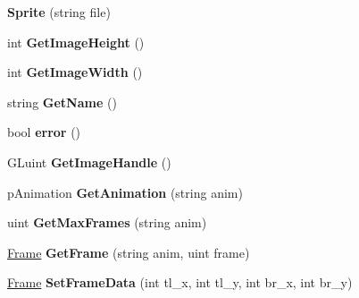 \begin{DoxyCompactItemize}
\item 
\hypertarget{classSprite_acde1b178d58809eccf9fd3791e9fcedf}{
{\bfseries Sprite} (string file)}
\label{classSprite_acde1b178d58809eccf9fd3791e9fcedf}

\item 
\hypertarget{classSprite_aeb66724513cb22636e1de4c3d409205a}{
int {\bfseries GetImageHeight} ()}
\label{classSprite_aeb66724513cb22636e1de4c3d409205a}

\item 
\hypertarget{classSprite_a1924333fc0272c4d565b75b665f2ba88}{
int {\bfseries GetImageWidth} ()}
\label{classSprite_a1924333fc0272c4d565b75b665f2ba88}

\item 
\hypertarget{classSprite_aa52fe643ed7c103b5c43295dcb24fe4e}{
string {\bfseries GetName} ()}
\label{classSprite_aa52fe643ed7c103b5c43295dcb24fe4e}

\item 
\hypertarget{classSprite_a9fca75610e94f0eedaeeea8c78379805}{
bool {\bfseries error} ()}
\label{classSprite_a9fca75610e94f0eedaeeea8c78379805}

\item 
\hypertarget{classSprite_a0f77680543c850cb6715238704fdd342}{
GLuint {\bfseries GetImageHandle} ()}
\label{classSprite_a0f77680543c850cb6715238704fdd342}

\item 
\hypertarget{classSprite_a053572baa76a5ba91ddd47787961786f}{
pAnimation {\bfseries GetAnimation} (string anim)}
\label{classSprite_a053572baa76a5ba91ddd47787961786f}

\item 
\hypertarget{classSprite_aa16f9f37eb312dd70cabcdea97b45369}{
uint {\bfseries GetMaxFrames} (string anim)}
\label{classSprite_aa16f9f37eb312dd70cabcdea97b45369}

\item 
\hypertarget{classSprite_ae952e5d3bbd4c562d8d31770f88b3016}{
\hyperlink{structFrame}{Frame} {\bfseries GetFrame} (string anim, uint frame)}
\label{classSprite_ae952e5d3bbd4c562d8d31770f88b3016}

\item 
\hypertarget{classSprite_a8af82c925f613b6d904142d5d27d7861}{
\hyperlink{structFrame}{Frame} {\bfseries SetFrameData} (int tl\_\-x, int tl\_\-y, int br\_\-x, int br\_\-y)}
\label{classSprite_a8af82c925f613b6d904142d5d27d7861}

\end{DoxyCompactItemize}
